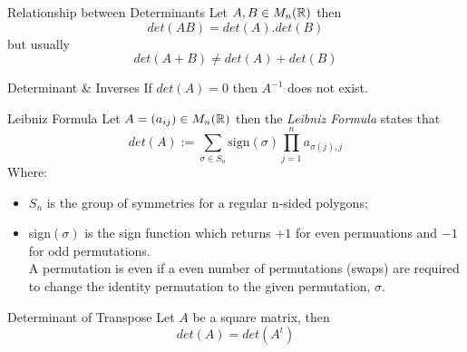 \documentclass[11pt,a4paper]{article}
\begin{document}
\subtitle{Theorem 6.05 - }{Relationship between Determinants}
Let $A, B \in M_{n}(\mathbb{R})$ then $$det(AB) = det(A).det(B)$$ but usually $$det(A + B) \not = det(A) + det(B)$$

\subtitle{Theorem 6.06 - }{Determinant \& Inverses}
If $det(A) = 0$ then $A^{-1}$ does not exist. \\

\subtitle{Theorem 6.07 - }{Leibniz Formula}
Let $A = (a_{ij}) \in M_n(\mathbb{R})$ then the \textit{Leibniz Formula} states that $$det(A) := \sum_{\sigma \in S_n} \mathrm{sign}(\sigma) \prod_{j=1}^{n}a_{\sigma(j),j}$$
Where: \begin{itemize}[label={-}]
  \item $S_n$ is the group of symmetries for a regular n-sided polygons;
  \item sign$(\sigma)$ is the sign function which returns $+1$ for even permuations and $-1$ for odd permutations. \\
  A permutation is even if a even number of permutations (swaps) are required to change the identity permutation to the given permutation, $\sigma$.
\end{itemize}

\subtitle{Remark 6.08 - }{Determinant of Transpose}
Let $A$ be a square matrix, then $$det(A) = det(A^t)$$
\end{document}
